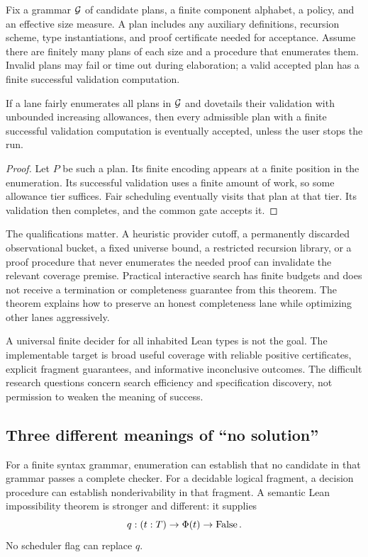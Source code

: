 Fix a grammar $\mathcal G$ of candidate plans, a finite component alphabet, a policy, and an effective size measure. A plan includes any auxiliary definitions, recursion scheme, type instantiations, and proof certificate needed for acceptance. Assume there are finitely many plans of each size and a procedure that enumerates them. Invalid plans may fail or time out during elaboration; a valid accepted plan has a finite successful validation computation.

\begin{theorem}\label{thm:complete}
If a lane fairly enumerates all plans in $\mathcal G$ and dovetails their validation with unbounded increasing allowances, then every admissible plan with a finite successful validation computation is eventually accepted, unless the user stops the run.
\end{theorem}
\begin{proof}
Let $P$ be such a plan. Its finite encoding appears at a finite position in the enumeration. Its successful validation uses a finite amount of work, so some allowance tier suffices. Fair scheduling eventually visits that plan at that tier. Its validation then completes, and the common gate accepts it.
\end{proof}

The qualifications matter. A heuristic provider cutoff, a permanently discarded observational bucket, a fixed universe bound, a restricted recursion library, or a proof procedure that never enumerates the needed proof can invalidate the relevant coverage premise. Practical interactive search has finite budgets and does not receive a termination or completeness guarantee from this theorem. The theorem explains how to preserve an honest completeness lane while optimizing other lanes aggressively.

A universal finite decider for all inhabited Lean types is not the goal. The implementable target is broad useful coverage with reliable positive certificates, explicit fragment guarantees, and informative inconclusive outcomes. The difficult research questions concern search efficiency and specification discovery, not permission to weaken the meaning of success.

\subsection{Three different meanings of ``no solution''}

For a finite syntax grammar, enumeration can establish that no candidate in that grammar passes a complete checker. For a decidable logical fragment, a decision procedure can establish nonderivability in that fragment. A semantic Lean impossibility theorem is stronger and different: it supplies
\[
 q:(t:T)\to\Phi(t)\to\operatorname{False}.
\]
No scheduler flag can replace $q$.

